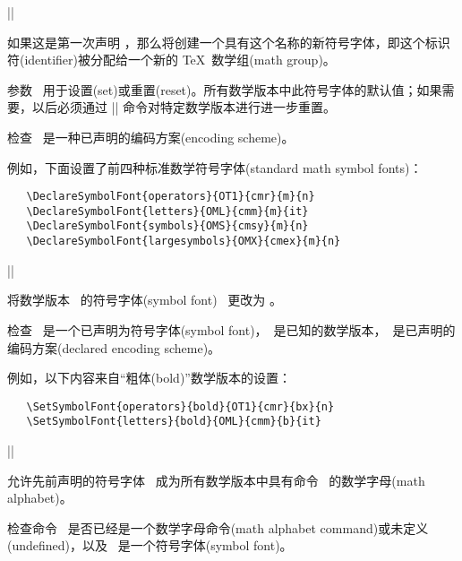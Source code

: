 \documentclass{ltxguide}[1995/11/28]
\newcommand{\kaiti}{\CJKfamily{kaiti}} %
\begin{document}
\begin{decl}
  |\DeclareSymbolFont|   
                        
\end{decl}

如果这是第一次声明 ，那么将创建一个具有这个名称的新符号字体，即这个标识符(identifier)被分配给一个新的 \TeX{}\ 数学组(math group)。

参数    \ 用于设置(set)或重置(reset)。{\kaiti 所有}数学版本中此符号字体的默认值；如果需要，以后必须通过 |\SetSymbolFont| 命令对特定数学版本进行进一步重置。

检查 \ 是一种已声明的编码方案(encoding scheme)。

例如，下面设置了前四种标准数学符号字体(standard math symbol fonts)：
\begin{verbatim}
   \DeclareSymbolFont{operators}{OT1}{cmr}{m}{n}
   \DeclareSymbolFont{letters}{OML}{cmm}{m}{it}
   \DeclareSymbolFont{symbols}{OMS}{cmsy}{m}{n}
   \DeclareSymbolFont{largesymbols}{OMX}{cmex}{m}{n}
\end{verbatim}

\begin{decl}
  |\SetSymbolFont|  \\
       \null\hfill {}   
\end{decl}

将数学版本 \ 的符号字体(symbol font) \ 更改为    。

检查 \ 是一个已声明为符号字体(symbol font)，\ 是已知的数学版本，\ 是已声明的编码方案(declared encoding scheme)。

例如，以下内容来自“粗体(bold)”数学版本的设置：
\begin{verbatim}
   \SetSymbolFont{operators}{bold}{OT1}{cmr}{bx}{n}
   \SetSymbolFont{letters}{bold}{OML}{cmm}{b}{it}
\end{verbatim}


\begin{decl}
  |\DeclareSymbolFontAlphabet|  
\end{decl}

允许先前声明的符号字体 \ 成为{\kaiti 所有}数学版本中具有命令 \ 的数学字母(math alphabet)。

检查命令 \ 是否已经是一个数学字母命令(math alphabet command)或未定义(undefined)，以及 \ 是一个符号字体(symbol font)。
\end{document}
